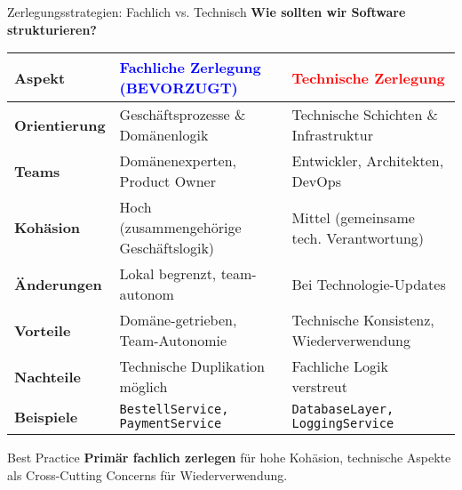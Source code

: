 \begin{frame}{Zerlegungsstrategien: Fachlich vs. Technisch}
  \textbf{Wie sollten wir Software strukturieren?}

  {\small
  \begin{tabular}{|l|l|l|}
    \hline
    \textbf{Aspekt} & \textcolor{blue}{\textbf{Fachliche Zerlegung (BEVORZUGT)}} & \textcolor{red}{\textbf{Technische Zerlegung}} \\
    \hline
    \textbf{Orientierung} & Geschäftsprozesse \& Domänenlogik & Technische Schichten \& Infrastruktur \\
    \hline
    \textbf{Teams} & Domänenexperten, Product Owner & Entwickler, Architekten, DevOps \\
    \hline
    \textbf{Kohäsion} & Hoch (zusammengehörige Geschäftslogik) & Mittel (gemeinsame tech. Verantwortung) \\
    \hline
    \textbf{Änderungen} & Lokal begrenzt, team-autonom & Bei Technologie-Updates \\
    \hline
    \textbf{Vorteile} & Domäne-getrieben, Team-Autonomie & Technische Konsistenz, Wiederverwendung \\
    \hline
    \textbf{Nachteile} & Technische Duplikation möglich & Fachliche Logik verstreut \\
    \hline
    \textbf{Beispiele} & \texttt{BestellService, PaymentService} & \texttt{DatabaseLayer, LoggingService} \\
    \hline
  \end{tabular}
  }

  \begin{exampleblock}{Best Practice}
    \textbf{Primär fachlich zerlegen} für hohe Kohäsion, technische Aspekte als Cross-Cutting Concerns für Wiederverwendung.
  \end{exampleblock}
\end{frame}

